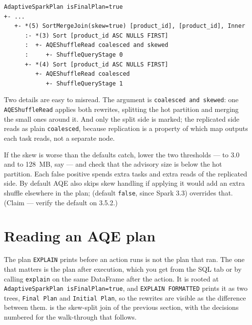\begin{lstlisting}[language=text,numbers=none,style=plan,caption={A skew-split join in a final plan (\texttt{EXPLAIN}, trimmed)},captionpos=b,label=lst:aqe-skew-plan]
AdaptiveSparkPlan isFinalPlan=true
+- ...
   +- *(5) SortMergeJoin(skew=true) [product_id], [product_id], Inner
      :- *(3) Sort [product_id ASC NULLS FIRST]
      :  +- AQEShuffleRead coalesced and skewed
      :     +- ShuffleQueryStage 0
      +- *(4) Sort [product_id ASC NULLS FIRST]
         +- AQEShuffleRead coalesced
            +- ShuffleQueryStage 1
\end{lstlisting}

Two details are easy to misread. The argument is \texttt{coalesced and skewed}:
one \texttt{AQEShuffleRead} applies both rewrites, splitting the hot partition
and merging the small ones around it. And only the split side is marked; the
replicated side reads as plain \texttt{coalesced}, because replication is a
property of which map outputs each task reads, not a separate node.

If the skew is worse than the defaults catch, lower the two thresholds ---
 to 3.0 and  to
128~MB, say --- and check that the advisory size is below the hot partition. Each
false positive spends extra tasks and extra reads of the replicated side. By
default AQE also skips skew handling if applying it would add an extra shuffle
elsewhere in the plan; 
(default \texttt{false}, since Spark 3.3) overrides that. (Claim --- verify the
default on 3.5.2.)

\section{Reading an AQE plan}
\label{sec:aqe-reading}

The plan \texttt{EXPLAIN} prints before an action runs is not the plan that ran.
The one that matters is the plan after execution, which you get from the SQL tab
or by calling \texttt{explain} on the same DataFrame after the action. It is
rooted at \texttt{AdaptiveSparkPlan isFinalPlan=true}, and \texttt{EXPLAIN
FORMATTED} prints it as two trees, \texttt{Final Plan} and \texttt{Initial Plan},
so the rewrites are visible as the difference between them.
 is the skew-split join of the previous section, with
the decisions numbered for the walk-through that follows.

